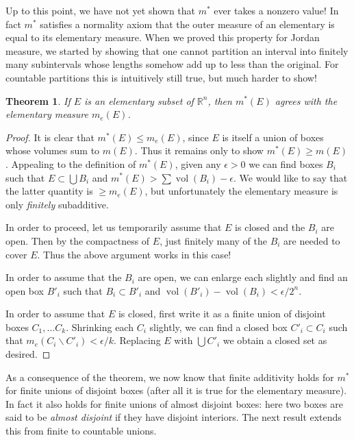 \documentclass[11pt,oneside]{amsbook}
\renewcommand{\setminus}{\smallsetminus}
\newcommand{\RR}{{\mathbb R}}
\DeclareMathOperator{\vol}{vol}
\theoremstyle{definition}
\theoremstyle{plain}
\newtheorem{thm}{Theorem}[section]
\theoremstyle{definition}
\theoremstyle{remark}
\numberwithin{equation}{section}
\numberwithin{figure}{section}
\begin{document}
Up to this point, we have not yet shown that $m^*$ ever takes a nonzero value! In fact $m^*$ satisfies a normality axiom that the outer measure of an elementary is equal to its elementary measure. When we proved this property for Jordan measure, we started by showing that one cannot partition an interval into finitely many subintervals whose lengths somehow add up to less than the original. For countable partitions this is intuitively still true, but much harder to show!

\begin{thm}
  If $E$ is an elementary subset of $\RR^n$, then $m^*(E)$ agrees with the elementary measure $m_e(E)$.
\end{thm}

\begin{proof}
  It is clear that $m^*(E)\leq m_e(E)$, since $E$ is itself a union of boxes whose volumes sum to $m(E)$. Thus it remains only to show $m^*(E)\geq m(E)$. Appealing to the definition of $m^*(E)$, given any $\epsilon>0$ we can find boxes $B_i$ such that $E\subset\bigcup B_i$ and $m^*(E)>\sum\vol(B_i)-\epsilon$. We would like to say that the latter quantity is $\geq m_e(E)$, but unfortunately the elementary measure is only \emph{finitely} subadditive.

  In order to proceed, let us temporarily assume that $E$ is closed and the $B_i$ are open. Then by the compactness of $E$, just finitely many of the $B_i$ are needed to cover $E$. Thus the above argument works in this case!

  In order to assume that the $B_i$ are open, we can enlarge each slightly and find an open box $B'_i$ such that $B_i\subset B'_i$ and $\vol(B'_i)-\vol(B_i)<\epsilon/2^n$.

  In order to assume that $E$ is closed, first write it as a finite union of disjoint boxes $C_1,\ldots C_k$. Shrinking each $C_i$ slightly, we can find a closed box $C'_i\subset C_i$ such that $m_e(C_i\setminus C'_i)<\epsilon/k$. Replacing $E$ with $\bigcup C'_i$ we obtain a closed set as desired.
\end{proof}

As a consequence of the theorem, we now know that finite additivity holds for $m^*$ for finite unions of disjoint boxes (after all it is true for the elementary measure). In fact it also holds for finite unions of almost disjoint boxes: here two boxes are said to be \emph{almost disjoint} if they have disjoint interiors. The next result extends this from finite to countable unions.
\end{document}
